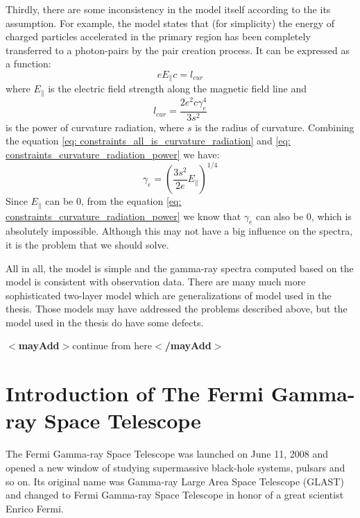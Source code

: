 \documentclass[12pt]{report}
\newcommand{\mayAdd}[1]{
  $<$\textbf{mayAdd}$>$#1$<$\textbf{/mayAdd}$>$
}
\begin{document}
            Thirdly, there are some inconsistency in the model itself according to the its assumption. 
            For example, the model states that (for simplicity) the energy of charged particles accelerated 
            in the primary region has been completely transferred to a photon-pairs by the pair creation process.
            It can be expressed as a function: 
            \begin{equation}
              \label{eq: constraints_all_is_curvature_radiation}
              e E_{\parallel} c = l_{cur}
            \end{equation}
            where $E_\parallel$ is the electric field strength along the magnetic field line and 
            \begin{equation}
              \label{eq: constraints_curvature_radiation_power}
              l_{cur} = \frac{2 e^2 c \gamma^{4}_{e}}{3s^2}
            \end{equation}
            is the power of curvature radiation, where $s$ is the radius of curvature. 
            Combining the equation \ref{eq: constraints_all_is_curvature_radiation} and 
            \ref{eq: constraints_curvature_radiation_power} we have: 
            \begin{equation}
              \label{eq: constraints_gamma_can_be_zero}
              \gamma_{e} = \left(\frac{3s^2}{2e} E_{\parallel}\right)^{1/4}
            \end{equation}
            Since $E_{\parallel}$ can be $0$, 
            from the equation \ref{eq: constraints_curvature_radiation_power} we know that 
            $\gamma_{e}$ can also be $0$, which is absolutely impossible. Although this may not have a big 
            influence on the spectra, it is the problem that we should solve. 

            All in all, the model is simple and the gamma-ray spectra computed based on the model is 
            consistent with observation data. There are many much more sophisticated two-layer model 
            which are generalizations of model used in the thesis. Those models may have addressed the 
            problems described above, but the model used in the thesis do have some defects. 

          \mayAdd{continue from here}

        \section{Introduction of The Fermi Gamma-ray Space Telescope}
          The Fermi Gamma-ray Space Telescope was launched on June 11, 2008 and opened a new window of studying
          supermassive black-hole systems, pulsars and so on. Its original name was Gamma-ray Large Area Space 
          Telescope (GLAST) and changed to Fermi Gamma-ray Space Telescope in honor of a great scientist 
          Enrico Fermi. 
\end{document}
